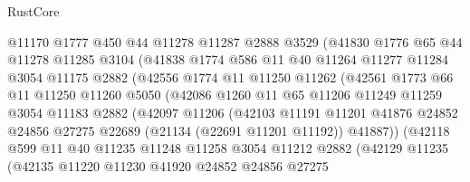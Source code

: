 \begin{lexlean}{RustCore}
\begin{coremodule}
                  @11170
                  @1777
                  @450
                  @44
                  @11278
                  @11287
                  @2888
                  @3529
                  (@41830
                    @1776
                    @65
                    @44
                    @11278
                    @11285
                    @3104
                    (@41838
                      @1774
                      @586
                      @11
                      @40
                      @11264
                      @11277
                      @11284
                      @3054
                      @11175
                      @2882
                      (@42556
                        @1774
                        @11
                        @11250
                        @11262
                        (@42561
                          @1773
                          @66
                          @11
                          @11250
                          @11260
                          @5050
                          (@42086
                            @1260
                            @11
                            @65
                            @11206
                            @11249
                            @11259
                            @3054
                            @11183
                            @2882
                            (@42097
                              @11206
                              (@42103
                                @11191
                                @11201
                                @41876
                                @24852
                                @24856
                                @27275
                                @22689
                                (@21134 (@22691 @11201 @11192))
                                @41887))
                            (@42118
                              @599
                              @11
                              @40
                              @11235
                              @11248
                              @11258
                              @3054
                              @11212
                              @2882
                              (@42129
                                @11235
                                (@42135
                                  @11220
                                  @11230
                                  @41920
                                  @24852
                                  @24856
                                  @27275

\end{coremodule}
\end{lexlean}
